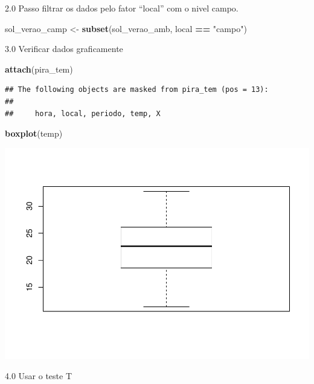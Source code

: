 \documentclass[
]{book}
\newenvironment{Shaded}{\begin{snugshade}}{\end{snugshade}}
\newcommand{\CommentTok}[1]{\textcolor[rgb]{0.56,0.35,0.01}{\textit{#1}}}
\newcommand{\DataTypeTok}[1]{\textcolor[rgb]{0.13,0.29,0.53}{#1}}
\newcommand{\DecValTok}[1]{\textcolor[rgb]{0.00,0.00,0.81}{#1}}
\newcommand{\FloatTok}[1]{\textcolor[rgb]{0.00,0.00,0.81}{#1}}
\newcommand{\KeywordTok}[1]{\textcolor[rgb]{0.13,0.29,0.53}{\textbf{#1}}}
\newcommand{\NormalTok}[1]{#1}
\newcommand{\OperatorTok}[1]{\textcolor[rgb]{0.81,0.36,0.00}{\textbf{#1}}}
\newcommand{\StringTok}[1]{\textcolor[rgb]{0.31,0.60,0.02}{#1}}
\begin{document}
2.0 Passo filtrar os dados pelo fator ``local'' com o nivel campo.

\begin{Shaded}
\begin{Highlighting}[]
\NormalTok{ sol_verao_camp <-}\StringTok{ }\KeywordTok{subset}\NormalTok{(sol_verao_amb, local }\OperatorTok{==}\StringTok{ "campo"}\NormalTok{)}
\end{Highlighting}
\end{Shaded}

3.0 Verificar dados graficamente

\begin{Shaded}
\begin{Highlighting}[]
\KeywordTok{attach}\NormalTok{(pira_tem)}
\end{Highlighting}
\end{Shaded}

\begin{verbatim}
## The following objects are masked from pira_tem (pos = 13):
## 
##     hora, local, periodo, temp, X
\end{verbatim}

\begin{Shaded}
\begin{Highlighting}[]
\KeywordTok{boxplot}\NormalTok{(temp)}
\end{Highlighting}
\end{Shaded}

\includegraphics{TudodoR_files/figure-latex/unnamed-chunk-248-1.pdf}

4.0 Usar o teste T

\begin{Shaded}
\end{Shaded}
\end{document}
